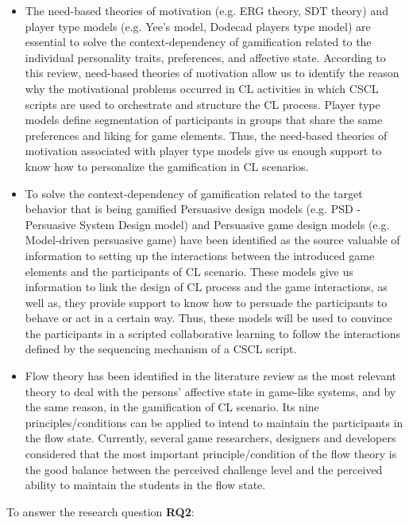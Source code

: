 \begin{itemize}
\item The need-based theories of motivation (e.g. ERG theory, SDT theory) and player type models (e.g. Yee's model, Dodecad players type model) are essential to solve the context-dependency of gamification related to the individual personality traits, preferences, and affective state.
According to this review, need-based theories of motivation allow us to identify the reason why the motivational problems occurred in CL activities in which CSCL scripts are used to orchestrate and structure the CL process.
Player type models define segmentation of participants in groups that share the same preferences and liking for game elements. 
Thus, the need-based theories of motivation associated with player type models give us enough support to know how to personalize the gamification in CL scenarios.

\item To solve the context-dependency of gamification related to the target behavior that is being gamified Persuasive design models (e.g. PSD - Persuasive System Design model) and Persuasive game design models (e.g. Model-driven persuasive game) have been identified as the source valuable of information to setting up the interactions between the introduced game elements and the participants of CL scenario.
These models give us information to link the design of CL process and the game interactions, as well as, they provide support to know how to persuade the participants to behave or act in a certain way.
Thus, these models will be used to convince the participants in a scripted collaborative learning to follow the interactions defined by the sequencing mechanism of a CSCL script.

\item Flow theory has been identified in the literature review as the most relevant theory to deal with the persons' affective state in game-like systems, and by the same reason, in the gamification of CL scenario.
Its nine principles/conditions can be applied to intend to maintain the participants in the flow state.
Currently, several game researchers, designers and developers considered that the most important principle/condition of the flow theory is the good balance between the perceived challenge level and the perceived ability to maintain the students in the flow state.
\end{itemize}


To answer the research question \textbf{RQ2}:

